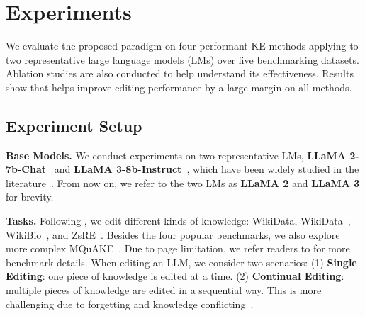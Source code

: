 
\section{Experiments}
\label{sec:experiment}



We evaluate the proposed {\NAME} paradigm on four performant KE methods applying to two representative large language models (LMs) over five benchmarking datasets. 
Ablation studies are also conducted to help understand its effectiveness. 
Results show that {\NAME} helps improve editing performance by a large margin on all methods. 


\subsection{Experiment Setup}


\textbf{Base Models.}
We conduct experiments on {two} representative LMs, \textbf{LLaMA 2-7b-Chat}~\citep{touvron2023llama} and \textbf{LLaMA 3-8b-Instruct}~\citep{dubey2024llama3}, which have been widely studied in the literature~\citep{zhang2024comprehensive, wang2024wise}. 
From now on, we refer to the two LMs as \textbf{LLaMA 2} and \textbf{LLaMA 3} for brevity. 




\textbf{Tasks.}
Following \citet{wang2023knowledge, zhang2024comprehensive}, 
we edit different kinds of knowledge: WikiData, WikiData~\citep{cohen2024evaluating}, WikiBio~\citep{hartvigsen2024aging}, and ZsRE~\citep{yao2023editing}. 
Besides the four popular benchmarks, 
we also explore more complex MQuAKE~\citep{zhong2023mquake,wang2024deepedit}.
Due to page limitation, we refer readers to \citet{zhang2024comprehensive} for more benchmark details.
When editing an LLM, we consider two scenarios: 
(1) \textbf{Single Editing}: one piece of knowledge is edited at a time. 
(2) \textbf{Continual Editing}: multiple pieces of knowledge are edited in a sequential way. This is more challenging due to forgetting and knowledge conflicting~\citep{hartvigsen2024aging, wang2024wise}. 



